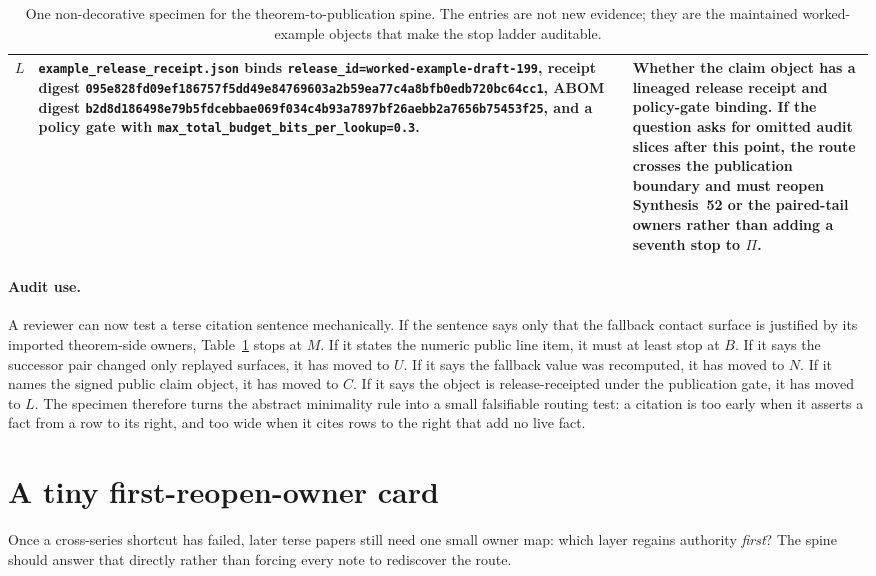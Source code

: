 \documentclass[11pt]{article}
\begin{document}
\begin{table}[t]
\begin{tabularx}{\linewidth}{@{}lX X@{}}
$L$ & \nolinkurl{example\_release\_receipt.json} binds \nolinkurl{release\_id=worked-example-draft-199}, receipt digest \nolinkurl{095e828fd09ef186757f5dd49e84769603a2b59ea77c4a8bfb0edb720bc64cc1}, ABOM digest \nolinkurl{b2d8d186498e79b5fdcebbae069f034c4b93a7897bf26aebb2a7656b75453f25}, and a policy gate with \nolinkurl{max\_total\_budget\_bits\_per\_lookup=0.3}. & Whether the claim object has a lineaged release receipt and policy-gate binding. If the question asks for omitted audit slices after this point, the route crosses the publication boundary and must reopen Synthesis~52 or the paired-tail owners rather than adding a seventh stop to $\Pi$. \\
\bottomrule
\end{tabularx}
\caption{One non-decorative specimen for the theorem-to-publication spine.  The entries are not new evidence; they are the maintained worked-example objects that make the stop ladder auditable.}
\label{tab:auditable-specimen-cut}
\end{table}

\paragraph{Audit use.}
A reviewer can now test a terse citation sentence mechanically.
If the sentence says only that the fallback contact surface is justified by its imported theorem-side owners, Table~\ref{tab:auditable-specimen-cut} stops at $M$.
If it states the numeric public line item, it must at least stop at $B$.
If it says the successor pair changed only replayed surfaces, it has moved to $U$.
If it says the fallback value was recomputed, it has moved to $N$.
If it names the signed public claim object, it has moved to $C$.
If it says the object is release-receipted under the publication gate, it has moved to $L$.
The specimen therefore turns the abstract minimality rule into a small falsifiable routing test: a citation is too early when it asserts a fact from a row to its right, and too wide when it cites rows to the right that add no live fact.

\section{A tiny first-reopen-owner card}
Once a cross-series shortcut has failed, later terse papers still need one small owner map: which layer regains authority \emph{first}? The spine should answer that directly rather than forcing every note to rediscover the route.
\end{document}
